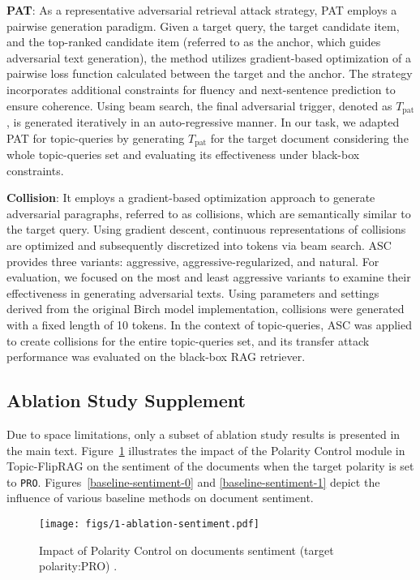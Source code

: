 \textbf{PAT}:  
As a representative adversarial retrieval attack strategy, PAT employs a pairwise generation paradigm. Given a target query, the target candidate item, and the top-ranked candidate item (referred to as the anchor, which guides adversarial text generation), the method utilizes gradient-based optimization of a pairwise loss function calculated between the target and the anchor. The strategy incorporates additional constraints for fluency and next-sentence prediction to ensure coherence. Using beam search, the final adversarial trigger, denoted as \( T_{\text{pat}} \), is generated iteratively in an auto-regressive manner. In our task, we adapted PAT for topic-queries by generating \( T_{\text{pat}} \) for the target document considering the whole topic-queries set and evaluating its effectiveness under black-box constraints.

\textbf{Collision}:  
It employs a gradient-based optimization approach to generate adversarial paragraphs, referred to as collisions, which are semantically similar to the target query. Using gradient descent, continuous representations of collisions are optimized and subsequently discretized into tokens via beam search. ASC provides three variants: aggressive, aggressive-regularized, and natural. For evaluation, we focused on the most and least aggressive variants to examine their effectiveness in generating adversarial texts. Using parameters and settings derived from the original Birch model implementation, collisions were generated with a fixed length of 10 tokens. In the context of topic-queries, ASC was applied to create collisions for the entire topic-queries set, and its transfer attack performance was evaluated on the black-box RAG retriever.



\subsection{Ablation Study Supplement}
Due to space limitations, only a subset of ablation study results is presented in the main text. Figure~\ref{sentiment-know-1} illustrates the impact of the Polarity Control module in Topic-FlipRAG on the sentiment of the documents when the target polarity is set to \texttt{PRO}. Figures~\ref{baseline-sentiment-0} and \ref{baseline-sentiment-1} depict the influence of various baseline methods on document sentiment.

\begin{figure}[]
  \centering
  \texttt{[image: figs/1-ablation-sentiment.pdf]}
  \caption{Impact of Polarity Control on documents sentiment (target polarity:PRO) . }
  \label{sentiment-know-1}
\end{figure}

